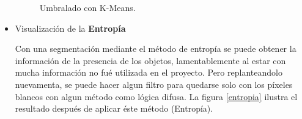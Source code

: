 \documentclass[a4paper, 11pt]{article}
\begin{document}
\begin{itemize}
  \begin{figure}[ht]%
    \centering
    \qquad
    \caption{Umbralado con K-Means.}%
    \label{kmeans}%
\end{figure}
  
\item Visualización de la \textbf{Entropía}

  Con una segmentación mediante el método de entropía se puede obtener la información de la presencia de los objetos, lamentablemente al estar con mucha información no fué utilizada en el proyecto. Pero replanteandolo nuevamenta, se puede hacer algun filtro para quedarse solo con los píxeles blancos con algun método como lógica difusa. La figura \ref{entropia} ilustra el resultado después de aplicar éste método (Entropía).

  \vspace{1cm}
  

\end{itemize}
\end{document}
